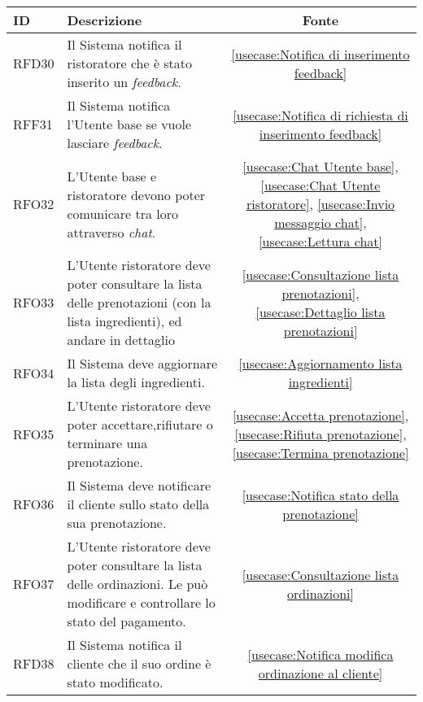 \begin{table}[H]
	\renewcommand{\arraystretch}{1.5}
	\centering
	\begin{tabularx}{\textwidth}{l|X|c}
		\textbf{ID} & \textbf{Descrizione}                                                                                                      & \textbf{Fonte} \\
		\hline
		RFD30       & Il Sistema notifica il ristoratore che è stato inserito un \textit{feedback}.                                                   &  \autoref{usecase:Notifica di inserimento feedback}           \\
		\hline
		RFF31       & Il Sistema notifica l'Utente base se vuole lasciare \textit{feedback}.                      									 & \autoref{usecase:Notifica di richiesta di inserimento feedback}            \\
		\hline
		RFO32       & L'Utente base e ristoratore devono poter comunicare tra loro attraverso \textit{chat}.                                		& \autoref{usecase:Chat Utente base}, \autoref{usecase:Chat Utente ristoratore}, \autoref{usecase:Invio messaggio chat}, \autoref{usecase:Lettura chat}               \\
		\hline
		RFO33       & L'Utente ristoratore deve poter consultare la lista delle prenotazioni (con la lista ingredienti), ed andare in dettaglio     &  \autoref{usecase:Consultazione lista prenotazioni}, \autoref{usecase:Dettaglio lista prenotazioni}           \\
		\hline
		RFO34       & Il Sistema deve aggiornare la lista degli ingredienti.        																& \autoref{usecase:Aggiornamento lista ingredienti}            \\
		\hline
		RFO35       & L'Utente ristoratore deve poter accettare,rifiutare o terminare una prenotazione. 											&  \autoref{usecase:Accetta prenotazione}, \autoref{usecase:Rifiuta prenotazione}, \autoref{usecase:Termina prenotazione}           \\
		\hline
		RFO36       & Il Sistema deve notificare il cliente sullo stato della sua prenotazione.						                                 & \autoref{usecase:Notifica stato della prenotazione}            \\
		\hline
		RFO37       & L'Utente ristoratore deve poter consultare la lista delle ordinazioni. Le può modificare e controllare lo stato del pagamento.   &  \autoref{usecase:Consultazione lista ordinazioni}           \\
		\hline
		RFD38       & Il Sistema notifica il cliente che il suo ordine è stato modificato.                   			 							&  \autoref{usecase:Notifica modifica ordinazione al cliente}           \\

\end{tabularx}
\end{table}
